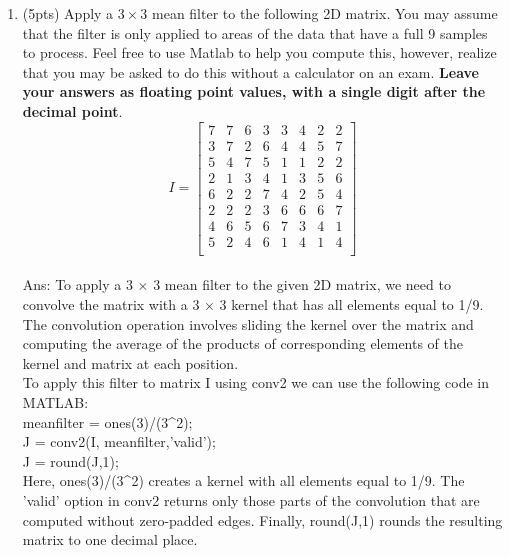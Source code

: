 \documentclass[12pt]{article}
\begin{document}
\begin{enumerate}
\item (5pts) Apply a $3\times3$ mean filter to the following 2D matrix.  You may assume that the filter is only applied to areas of the data that have a full 9 samples to process.  Feel free to use Matlab to help you compute this, however, realize that you may be asked to do this without a calculator on an exam.  \textbf{Leave your answers as floating point values, with a single digit after the decimal point}.
$$ I=\begin{bmatrix}	7&     7&     6&     3&     3&     4&     2&     2\\
							3&     7&     2&     6&     4&     4&     5&     7\\
							5&     4&     7&     5&     1&     1&     2&     2\\
							2&     1&     3&     4&     1&     3&     5&     6\\
							6&     2&     2&     7&     4&     2&     5&     4\\
							2&     2&     2&     3&     6&     6&     6&     7\\
							4&     6&     5&     6&     7&     3&     4&     1\\
							5&     2&     4&     6&     1&     4&     1&     4\\
\end{bmatrix}$$\\
Ans: To apply a 3 × 3 mean filter to the given 2D matrix, we need to convolve the matrix with a 3 × 3 kernel that has all elements equal to 1/9. The convolution operation involves sliding the kernel over the matrix and computing the average of the products of corresponding elements of the kernel and matrix at each position.\\

To apply this filter to matrix I using conv2 we can use the following code in MATLAB:\\

meanfilter = ones(3)/(3\^{}2);\\
J = conv2(I, meanfilter,'valid');\\
J = round(J,1);\\

Here, ones(3)/(3\^{}2) creates a kernel with all elements equal to 1/9. The 'valid' option in conv2 returns only those parts of the convolution that are computed without zero-padded edges. Finally, round(J,1) rounds the resulting matrix to one decimal place.\\


\end{enumerate}
\end{document}
